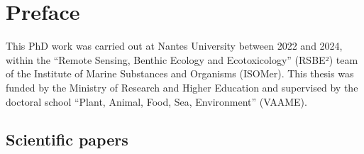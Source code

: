 \documentclass[
  letterpaper,
  11pt,
  english,
  singlespacing,
  headsepline]{MastersDoctoralThesis}
\begin{document}

\chapter*{Preface}\label{preface}


This PhD work was carried out at Nantes University between 2022 and
2024, within the ``Remote Sensing, Benthic Ecology and Ecotoxicology''
(RSBE²) team of the Institute of Marine Substances and Organisms
(ISOMer). This thesis was funded by the Ministry of Research and Higher
Education and supervised by the doctoral school ``Plant, Animal, Food,
Sea, Environment'' (VAAME).

\section*{Scientific papers}\label{scientific-papers}

\end{document}
